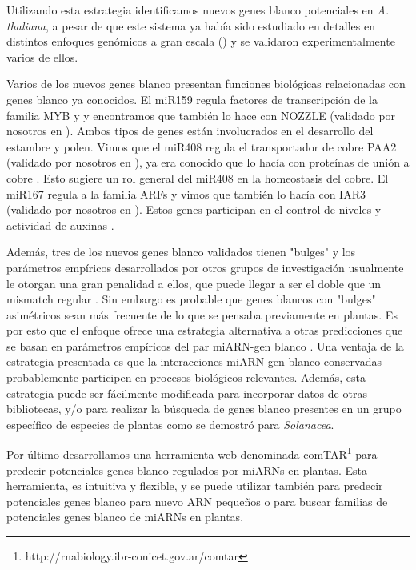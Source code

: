 Utilizando esta estrategia identificamos nuevos genes blanco potenciales en \textit{A. thaliana}, a pesar de que este sistema ya había sido estudiado en detalles en distintos enfoques genómicos a gran escala (\citep{Allen2005207,JonesRhoades2004787,Addo-quaye2009a,German2008,Rajagopalan2006,Schwab2005517}) y se validaron experimentalmente varios de ellos.

Varios de los nuevos genes blanco presentan funciones biológicas relacionadas con genes blanco ya conocidos.
El miR159 regula factores de transcripción de la familia MYB y y encontramos que también lo hace con NOZZLE (validado por nosotros en \citep{Chorostecki05072012}).
Ambos tipos de genes están involucrados en el desarrollo del estambre y polen\citep{Millar2005,Biology1999,Yang1999,pmid17916625}.
Vimos que el miR408 regula el transportador de cobre PAA2 (validado por nosotros en \citep{Chorostecki05072012}), ya era conocido que lo hacía con proteínas de unión a cobre \citep{JonesRhoades2004787,German2008,Schwab2005517,pmid15258262}.
Esto sugiere un rol general del miR408 en la homeostasis del cobre.
El miR167 regula a la familia ARFs \citep{Rhoades2002513,pmid17021043} y vimos que también lo hacía con IAR3 (validado por nosotros en \citep{Chorostecki05072012}).
Estos genes participan en el control de niveles y actividad de auxinas \citep{Davies1999,pmid15491917}.

Además, tres de los nuevos genes blanco validados tienen "bulges" y los parámetros empíricos desarrollados por otros grupos de investigación usualmente le otorgan una gran penalidad a ellos, que puede llegar a ser el doble que un mismatch regular \citep{JonesRhoades2004787}.
Sin embargo es probable que genes blancos con "bulges" asimétricos sean más frecuente de lo que se pensaba previamente en plantas.
Es por esto que el enfoque ofrece una estrategia alternativa a otras predicciones que se basan en parámetros empíricos del par miARN-gen blanco \citep{Allen2005207,JonesRhoades2004787,citeulike:8816489,Fahlgren_chapter}.
Una ventaja de la estrategia presentada es que la interacciones miARN-gen blanco conservadas probablemente participen en procesos biológicos relevantes.
Además, esta estrategia puede ser fácilmente modificada para incorporar datos de otras bibliotecas, y/o para realizar la búsqueda de genes blanco presentes en un grupo específico de especies de plantas como se demostró para \textit{Solanacea}.

Por último desarrollamos una herramienta web denominada comTAR\footnote{http://rnabiology.ibr-conicet.gov.ar/comtar} para predecir potenciales genes blanco regulados por miARNs en plantas.
Esta herramienta, es intuitiva y flexible, y se puede utilizar también para predecir potenciales genes blanco para nuevo ARN pequeños o para buscar familias de potenciales genes blanco de miARNs en plantas. 

